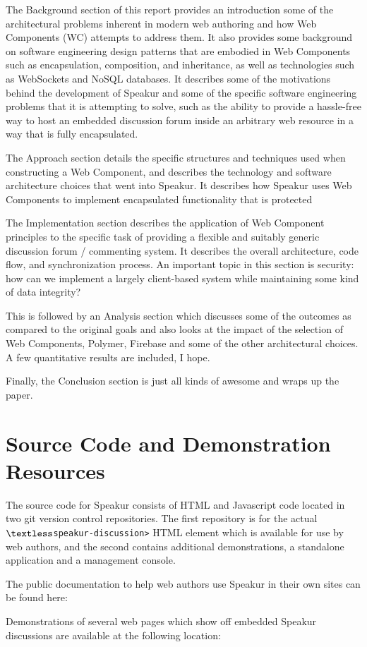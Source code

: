 The Background section of this report provides an introduction some of the architectural problems inherent in modern web authoring and how Web Components (WC) attempts to address them. 
It also provides some background on software engineering design patterns that are embodied in Web Components such as encapsulation, composition, and inheritance, as well as technologies such as WebSockets and NoSQL databases.
It describes some of the motivations behind the development of Speakur and some of the specific software engineering problems that it is attempting to solve, such as the ability to provide a hassle-free way to host an embedded discussion forum inside an arbitrary web resource in a way that is fully encapsulated.

The Approach section details the specific structures and techniques used when constructing a Web Component, and describes the technology and software architecture choices that went into Speakur. 
It describes how Speakur uses Web Components to implement encapsulated functionality that is protected 

The Implementation section describes the application of Web Component principles to the specific task of providing a flexible and suitably generic discussion forum / commenting system. 
It describes the overall architecture, code flow, and synchronization process. 
An important topic in this section is security: how can we implement a largely client-based system while maintaining some kind of data integrity?

This is followed by an Analysis section which discusses some of the outcomes as compared to the original goals and also looks at the impact of the selection of Web Components, Polymer, Firebase and some of the other architectural choices. A few quantitative results are included, I hope.

Finally, the Conclusion section is just all kinds of awesome and wraps up the paper. 

\section{Source Code and Demonstration Resources}
%

The source code for Speakur consists of HTML and Javascript code located in two git version control repositories. The first repository is for the actual \texttt{$\textless$speakur-discussion\textgreater} HTML element which is available for use by web authors, and the second contains additional demonstrations, a standalone application and a management console.

The public documentation to help web authors use Speakur in their own sites can be found here:

Demonstrations of several web pages which show off embedded Speakur discussions are available at the following location:

